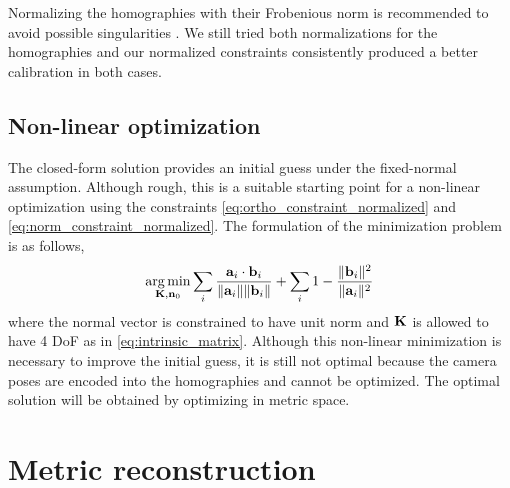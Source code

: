 \documentclass[10pt,twocolumn,letterpaper]{article}
\begin{document}
Normalizing the homographies with their Frobenious norm is recommended to avoid possible singularities \cite{hartley2003}. We still tried both normalizations for the homographies and our normalized constraints consistently produced a better calibration in both cases. 

%

\subsection{Non-linear optimization}

The closed-form solution provides an initial guess under the fixed-normal assumption. Although rough, this is a suitable starting point for a non-linear optimization using the constraints \eqref{eq:ortho_constraint_normalized} and \eqref{eq:norm_constraint_normalized}. The formulation of the minimization problem is as follows, 
%
\begin{align}
\operatorname*{arg\,min}_{\mathbf{K},\mathbf{n}_0} 
\sum_i 
\frac{\mathbf{a}_i \cdot \mathbf{b}_i}{\lVert\mathbf{a}_i\rVert \lVert\mathbf{b}_i\rVert} +
\sum_i 
1 - \frac{\lVert\mathbf{b}_i\rVert^2}{\lVert\mathbf{a}_i\rVert^2}
\label{eq:calib_ba}
\end{align}
%
where the normal vector is constrained to have unit norm and $\mathbf{K}$ is allowed to have 4 DoF as in \eqref{eq:intrinsic_matrix}. Although this non-linear minimization is necessary to improve the initial guess, it is still not optimal because the camera poses are encoded into the homographies and cannot be optimized. The optimal solution will be obtained by optimizing in metric space.

\section{Metric reconstruction}
\label{section:metric}
\end{document}
